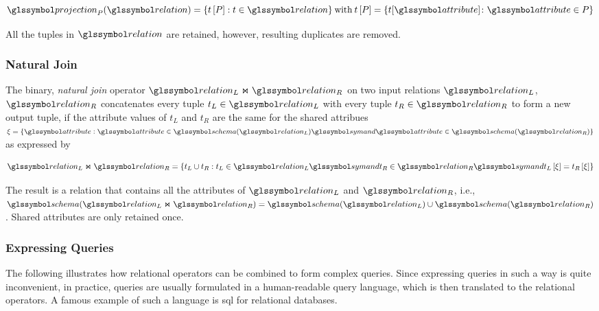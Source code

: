 \begin{equation}
    \label{equation:rel_op_projection}
    \projection_{P}(\relation) = \{ t\left[ P \right] : t \in \relation \} \: \textrm{with} \: t\left[ P \right] = \{ t[\attribute] \colon \attribute \in P \}
\end{equation}

All the tuples in $\relation$ are retained, however, resulting duplicates are removed.

\subsubsection{Natural Join}

The binary, \emph{natural join} operator $\relation_L \Join \relation_R$ on two input relations $\relation_L$, $\relation_R$ concatenates every tuple $t_{L} \in \relation_L$ with every tuple $t_{R} \in \relation_R$ to form a new output tuple, if the attribute values of $t_{L}$ and $t_{R}$ are the same for the shared attribues $\xi = \{ \attribute : \attribute \in \schema(\relation_L) \symand \attribute \in \schema(\relation_R) \}$ as expressed by 

\begin{equation}
    \label{equation:rel_op_join}
    \relation_L \Join \relation_R = \{ t_L \cup t_R : t_L \in \relation_L \symand t_R \in \relation_R \symand t_L\left[ \xi \right] = t_R\left[ \xi \right] \}
\end{equation}

The result is a relation that contains all the attributes of $\relation_L$ and $\relation_R$, i.e., $\schema(\relation_L \Join \relation_R) = \schema(\relation_L) \cup \schema(\relation_R)$. Shared attributes are only retained once.

\subsubsection{Expressing Queries}

The following  illustrates how relational operators can be combined to form complex queries. Since expressing queries in such a way is quite inconvenient, in practice, queries are usually formulated in a human-readable query language, which is then translated to the relational operators. A famous example of such a language is \acrshort{sql} \cite{Chamberlin:2012Early} for relational databases.

